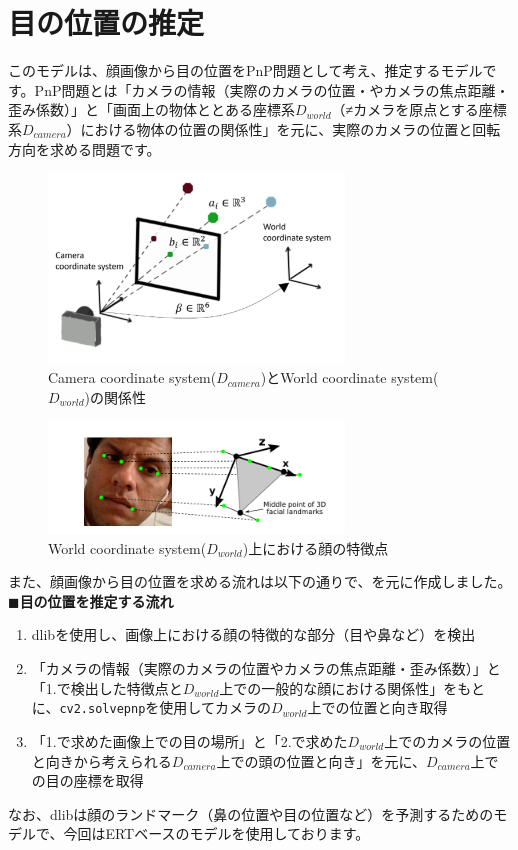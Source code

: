 \section{目の位置の推定}
このモデルは、顔画像から目の位置をPnP問題として考え、推定するモデルです。PnP問題とは「カメラの情報（実際のカメラの位置・やカメラの焦点距離・歪み係数）」と「画面上の物体ととある座標系$D_{world}$（≠カメラを原点とする座標系$D_{camera}$）における物体の位置の関係性」を元に、実際のカメラの位置と回転方向を求める問題です。
\begin{figure}[!ht]
    \centering
    \includegraphics[width=0.7\textwidth]{eye-track-cursor/fig/camera_world_coordinate.png}
    \caption{Camera coordinate system($D_{camera}$)とWorld coordinate system($D_{world}$)の関係性}
    \label{fig:camera_world_coordinate}
\end{figure}
\begin{figure}[!ht]
    \centering
    \includegraphics[width=0.7\textwidth]{eye-track-cursor/fig/world_coordinate.png}
    \caption{World coordinate system($D_{world}$)上における顔の特徴点}
    \label{fig:world_coordinate}
\end{figure}
また、顔画像から目の位置を求める流れは以下の通りで、\cite{zhang2017mpiigaze}を元に作成しました。\\
$\blacksquare$\textbf{目の位置を推定する流れ}
\begin{enumerate}
    \item dlibを使用し、画像上における顔の特徴的な部分（目や鼻など）を検出
    \item 「カメラの情報（実際のカメラの位置やカメラの焦点距離・歪み係数）」と「1.で検出した特徴点と$D_{world}$上での一般的な顔における関係性」をもとに、\texttt{cv2.solvepnp}を使用してカメラの$D_{world}$上での位置と向き取得
    \item 「1.で求めた画像上での目の場所」と「2.で求めた$D_{world}$上でのカメラの位置と向きから考えられる$D_{camera}$上での頭の位置と向き」を元に、$D_{camera}$上での目の座標を取得
\end{enumerate}
なお、dlibは顔のランドマーク（鼻の位置や目の位置など）を予測するためのモデルで、今回はERTベースのモデル\cite{valle2018deeply}を使用しております。

